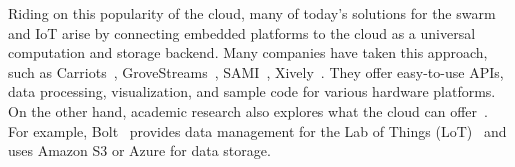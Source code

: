 Riding on this popularity of the cloud, many of today's solutions for the swarm
and IoT arise by connecting embedded platforms to the cloud as a universal
computation and storage backend. Many companies have taken this approach, such
as Carriots~\cite{carriots}, GroveStreams~\cite{grovestreams}, SAMI~\cite{sami},
Xively~\cite{xively}. They offer easy-to-use APIs, data processing,
visualization, and sample code for various hardware platforms. On the other
hand, academic research also explores what the cloud can
offer~\cite{gupta2014bolt, zachariah1001internet}.  For example,
Bolt~\cite{gupta2014bolt} provides data management for the Lab of Things
(LoT)~\cite{brush2013lab} and uses Amazon S3 or Azure for data storage.

